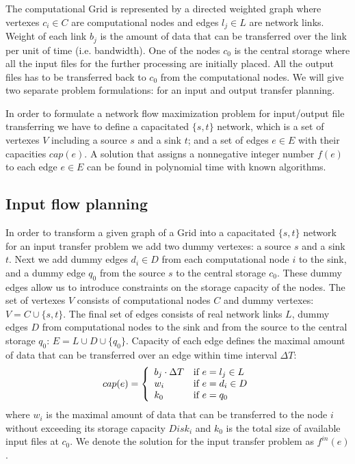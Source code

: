 \documentclass[english]{ddny}
\begin{document}
The computational Grid is represented by a directed weighted graph where
vertexes $c_{i} \in C$ are computational nodes and edges $l_{j} \in L$ are
network links. Weight of each link $b_{j}$ is the amount of data that can be
transferred over the link per unit of time (i.e. bandwidth). One of the nodes
$c_{0}$ is the central storage where all the input files for the further
processing are initially placed. All the output files has to be transferred
back to $c_{0}$ from the computational nodes. We will give two separate
problem formulations: for an input and output transfer planning. 

In order to formulate a network flow maximization problem \cite{Network_flows}
for input/output file transferring we have to define a capacitated $\{s,t\}$
network, which is a set of vertexes $V$ including a source $s$ and a sink $t$;
and a set of edges $e\in E$ with their capacities $cap(e)$. A solution that
assigns a nonnegative integer number $f(e)$ to each edge $e \in E$ can be
found in polynomial time with known algorithms.

\subsection{Input flow planning}
In order to transform a given graph of a Grid into a capacitated $\{s,t\}$
network for an input transfer problem we add two dummy vertexes: a source $s$
and a sink $t$. Next we add  dummy edges $d_{i} \in D$ from each computational
node $i$ to the sink, and a dummy edge $q_{0}$ from the source $s$ to the
central storage $c_{0}$. These dummy edges allow us to introduce constraints
on the storage capacity of the nodes. The set of vertexes $V$ consists of
computational nodes $C$ and dummy vertexes: $V= C \cup \{s,t\}$. The final set
of edges consists of real network links $L$, dummy edges $D$ from
computational nodes to the sink and from the source to the central storage
$q_{0}$: $E= L \cup D \cup \{q_{0}\}$. Capacity of each edge defines the
maximal amount of data that can be transferred over an edge within time
interval $\Delta T$: 
%
\begin{equation} 
\label{edge_cap} 
cap(e) = \left\{
\begin{array}{l l} 
b_{j} \cdot \Delta T & \text{if }e = l_{j} \in L \\ w_{i} &
\text{if } e = d_{i} \in D\\ k_{0} & \text{if } e = q_{0} 
\end{array} \right.
\end{equation} 
%
where $w_{i}$ is the maximal amount of data that can be
transferred to the node $i$ without exceeding its storage capacity $Disk_{i}$
and $k_{0}$ is the total size of available input files at $c_{0}$. We denote
the solution for the input transfer problem as $f^{in}(e)$.
\end{document}

